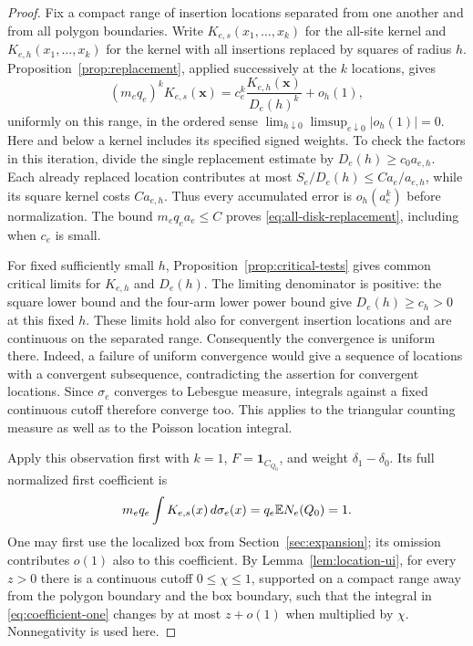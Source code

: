 \begin{proof}
Fix a compact range of insertion locations separated from one another
and from all polygon boundaries. Write $K_{e,s}(x_1,\ldots,x_k)$ for
the all-site kernel and $K_{e,h}(x_1,\ldots,x_k)$ for the kernel with
all insertions replaced by squares of radius $h$.
Proposition~\ref{prop:replacement}, applied successively at the $k$
locations, gives
\begin{equation}
 (m_e q_e)^k K_{e,s}(\boldsymbol x)
 =c_e^k\frac{K_{e,h}(\boldsymbol x)}{D_e(h)^k}
       +o_h(1),
 \label{eq:all-disk-replacement}
\end{equation}
uniformly on this range, in the ordered sense
$\lim_{h\downarrow0}\limsup_{e\downarrow0}|o_h(1)|=0$.
Here and below a kernel includes its specified signed weights.
To check the factors in this iteration, divide the single replacement
estimate by $D_e(h)\ge c_0 a_{e,h}$. Each already replaced location
contributes at most
$S_e/D_e(h)\le C a_e/a_{e,h}$, while its square kernel costs
$C a_{e,h}$. Thus every accumulated error is $o_h(a_e^k)$ before
normalization. The bound $m_e q_e a_e\le C$ proves
\eqref{eq:all-disk-replacement}, including when $c_e$ is small.

For fixed sufficiently small $h$, Proposition~\ref{prop:critical-tests}
gives common critical limits for $K_{e,h}$ and $D_e(h)$.
The limiting denominator is positive: the square lower bound and the
four-arm lower power bound give $D_e(h)\ge c_h>0$ at this fixed $h$.
These limits hold also for convergent insertion locations and are
continuous on the separated range. Consequently the convergence is
uniform there. Indeed, a failure of uniform convergence would give
a sequence of locations with a convergent subsequence, contradicting
the assertion for convergent locations. Since $\sigma_e$ converges
to Lebesgue measure, integrals against a fixed continuous cutoff
therefore converge too. This applies to the triangular counting
measure as well as to the Poisson location integral.

Apply this observation first with $k=1$, $F=\mathbf1_{C_{Q_0}}$, and
weight $\delta_1-\delta_0$. Its full normalized first coefficient is
\begin{equation}
 m_e q_e\int K_{e,s}(x)\,d\sigma_e(x)
       =q_e\mathbb E N_e(Q_0)=1.
 \label{eq:coefficient-one}
\end{equation}
One may first use the localized box from
Section~\ref{sec:expansion}; its omission contributes $o(1)$ also to
this coefficient. By Lemma~\ref{lem:location-ui}, for every $z>0$
there is a continuous cutoff $0\le\chi\le1$, supported on a compact
range away from the polygon boundary and the box boundary, such that
the integral in \eqref{eq:coefficient-one} changes by at most $z+o(1)$
when multiplied by $\chi$. Nonnegativity is used here.


\end{proof}
